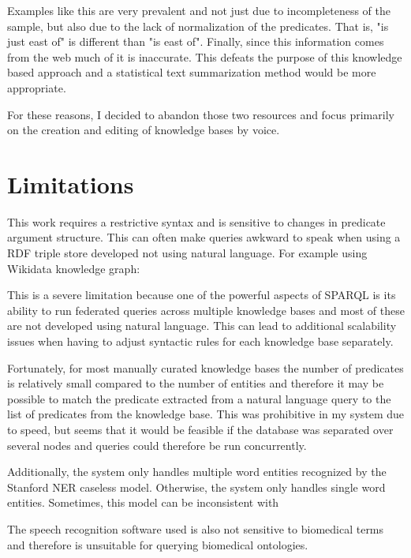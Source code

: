 \documentclass[11pt]{article}
\begin{document}


Examples like this are very prevalent and not just due to incompleteness of the sample, but also due to the lack of normalization of the predicates. That is, "is just east of" is different than "is east of". Finally, since this information comes from the web much of it is inaccurate. This defeats the purpose of this knowledge based approach and a statistical text summarization method would be more appropriate.

For these reasons, I decided to abandon those two resources and focus primarily on the creation and editing of knowledge bases by voice.

\section{Limitations}
This work requires a restrictive syntax and is sensitive to changes in predicate argument structure. This can often make queries awkward to speak when using a RDF triple store developed not using natural language. For example using Wikidata knowledge graph:


This is a severe limitation because one of the powerful aspects of SPARQL is its ability to run federated queries across multiple knowledge bases and most of these are not developed using natural language. This can lead to additional scalability issues when having to adjust syntactic rules for each knowledge base separately.

Fortunately, for most manually curated knowledge bases the number of predicates is relatively small compared to the number of entities and therefore it may be possible to match the predicate extracted from a natural language query to the list of predicates from the knowledge base. This was prohibitive in my system due to speed, but seems that it would be feasible if the database was separated over several nodes and queries could therefore be run concurrently. 

Additionally, the system only handles multiple word entities recognized by the Stanford NER caseless model. Otherwise, the system only handles single word entities. Sometimes, this model can be inconsistent with 

The speech recognition software used is also not sensitive to biomedical terms and therefore is unsuitable for querying biomedical ontologies.
\end{document}
